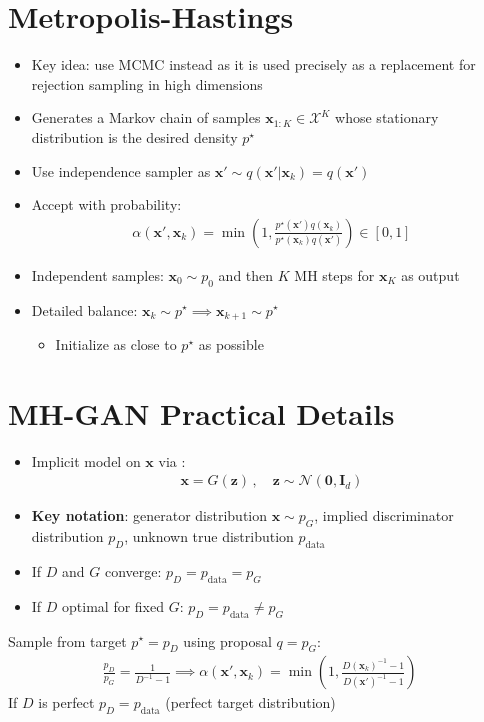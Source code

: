 \documentclass[a0,landscape]{a0poster}
\newcommand{\mysection}[1]{\section*{\fontsize{67.1}{82} \selectfont \color{NavyBlue} #1 \color{Black}}}
\renewcommand{\vec}[1]{{\boldsymbol{\mathbf{#1}}}} %
\newcommand{\R}{\mathbb{R}}
\newcommand{\set}[1]{\mathcal{#1}}
\newcommand{\sample}{\sim}
\newcommand{\given}{|}
\newcommand{\norm}{\mathcal{N}}
\newcommand{\target}{{p^\star}}
\newcommand{\prop}{q}
\newcommand{\pinit}{{p_0}}
\newcommand{\PG}{{p_G}}
\newcommand{\PD}{{p_D}}
\newcommand{\PR}{{p_{\textrm{data}}}}
\newcommand{\accept}{\alpha}
\newcommand{\setx}{\set{X}}
\begin{document}
\begin{multicols}{3}
\columnbreak

\mysection{Metropolis-Hastings}

\begin{itemize}
  \item Key idea: use MCMC instead as it is used precisely as a replacement for rejection sampling in high dimensions
  \item Generates a Markov chain of samples $\vec x_{1:K} \in \setx^K$ whose stationary distribution is the desired density $\target$
  \item Use independence sampler as $\vec x' \sample \prop(\vec x' \given \vec x_k)=\prop(\vec x')$
  \item Accept with probability:
  \begin{align}
    \accept(\vec x', \vec x_k) = \min\left(1, \frac{\target(\vec x')\prop(\vec x_k)}{\target(\vec x_k)\prop(\vec x')}\right) \in [0,1]
  \end{align}
  \item Independent samples: $\vec x_0 \sample \pinit$ and then $K$ MH steps for $\vec x_K$ as output
  \item Detailed balance: $\vec x_k \sample \target \implies \vec x_{k+1} \sample \target$
  \begin{itemize}
    \item Initialize as close to $\target$ as possible
  \end{itemize}
\end{itemize}

\mysection{MH-GAN Practical Details}

\begin{itemize}
  \item Implicit model on $\vec x$ via \smash{$G \in \R^{d} \rightarrow \setx$}:
  \begin{align}
    \vec x = G(\vec z)\,, \quad \vec z \sample \norm(\vec 0, \vec I_{d})
  \end{align}
  \item \textbf{Key notation}: generator distribution $\vec x \sample \PG$, implied discriminator distribution $\PD$, unknown true distribution $\PR$
  \item If $D$ and $G$ converge: $\PD = \PR = \PG$
  \item If $D$ optimal for fixed $G$: $\PD = \PR \neq \PG$
\end{itemize}

Sample from target $\target=\PD$ using proposal $\prop=\PG$:
\begin{align}
  \frac{\PD}{\PG} = \frac{1}{D^{-1} - 1} \implies
  \accept(\vec x', \vec x_k) = \min\left(1, \frac{D(\vec x_k)^{-1} - 1}{D(\vec x')^{-1} - 1}\right)
\end{align}
If $D$ is perfect $\PD = \PR$ (perfect target distribution)


\end{multicols}
\end{document}
